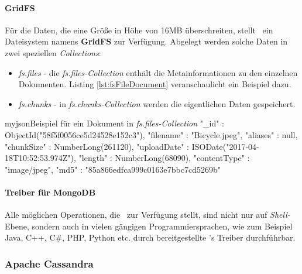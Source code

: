 \paragraph{GridFS}
Für die Daten, die eine Größe in Höhe von 16MB überschreiten, stellt \mongo\ ein Dateisystem namens \textbf{GridFS} zur Verfügung. Abgelegt werden solche Daten in zwei speziellen \textit{Collections}:

\begin{itemize}

\item \textit{fs.files} - die \textit{fs.files-Collection} enthält die Metainformationen zu den einzelnen Dokumenten. Listing \ref{lst:fsFileDocument} veranschaulicht ein Beispiel dazu.
\item \textit{fs.chunks} - in \textit{fs.chunks-Collection} werden die eigentlichen Daten gespeichert.

\end{itemize}

\begin{listingsboxJava}[label={lst:fsFileDocument}]{myjson}{Beispiel für ein Dokument in \textit{fs.files-Collection}}
{
	"_id" : ObjectId("58f5f0056ce5d24528e152c3"),
	"filename" : "Bicycle.jpeg",
	"aliases" : null,
	"chunkSize" : NumberLong(261120),
	"uploadDate" : ISODate("2017-04-18T10:52:53.974Z"),
	"length" : NumberLong(68090),
	"contentType" : "image/jpeg",
	"md5" : "85a866edfca999c0163e7bbc7cd5269b"
}
\end{listingsboxJava}

\paragraph{Treiber für MongoDB}
Alle möglichen Operationen, die \mongo\ zur Verfügung stellt, sind nicht nur auf \textit{Shell-}Ebene, sondern auch in vielen gängigen Programmiersprachen, wie zum Beispiel Java, C++, C\#, PHP, Python etc. durch bereitgestellte \mongo's Treiber \cite{mongoTreiber} durchführbar.

\subsubsection{Apache Cassandra}

